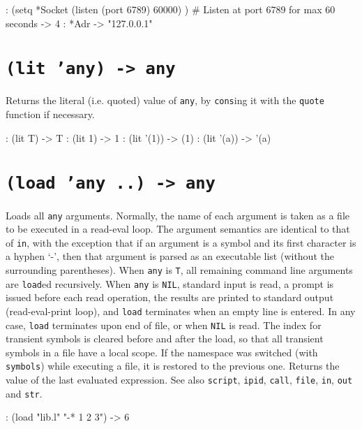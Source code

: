 \begin{wideverbatim}
: (setq *Socket
   (listen (port 6789) 60000) )  # Listen at port 6789 for max 60 seconds
-> 4
: *Adr
-> "127.0.0.1"
\end{wideverbatim}

 
\section*{\texttt{(lit 'any) -> any}}
\label{sec:func-ref-L-(lit 'any) -> any}


Returns the literal (i.e. quoted) value of \texttt{any}, by \texttt{cons}ing it with the \texttt{quote} function if necessary.


\begin{wideverbatim}
: (lit T)
-> T
: (lit 1)
-> 1
: (lit '(1))
-> (1)
: (lit '(a))
-> '(a)
\end{wideverbatim}

 
\section*{\texttt{(load 'any ..) -> any}}
\label{sec:func-ref-L-(load 'any ..) -> any}


Loads all \texttt{any} arguments. Normally, the name of each argument is taken
as a file to be executed in a read-eval loop. The argument semantics are
identical to that of \texttt{in}, with the exception that if an argument is a
symbol and its first character is a hyphen `-', then that argument is
parsed as an executable list (without the surrounding parentheses). When
\texttt{any} is \texttt{T}, all remaining command line arguments are \texttt{load}ed recursively. When \texttt{any} is \texttt{NIL}, standard input is read, a prompt is
issued before each read operation, the results are printed to standard
output (read-eval-print loop), and \texttt{load} terminates when an empty line
is entered. In any case, \texttt{load} terminates upon end of file, or when
\texttt{NIL} is read. The index for transient symbols is cleared before and
after the load, so that all transient symbols in a file have a local
scope. If the namespace was switched (with \texttt{symbols}) while executing a
file, it is restored to the previous one. Returns the value of the last
evaluated expression. See also \texttt{script}, \texttt{ipid}, \texttt{call}, \texttt{file}, \texttt{in},
\texttt{out} and \texttt{str}.


\begin{wideverbatim}
: (load "lib.l" "-* 1 2 3")
-> 6
\end{wideverbatim}

